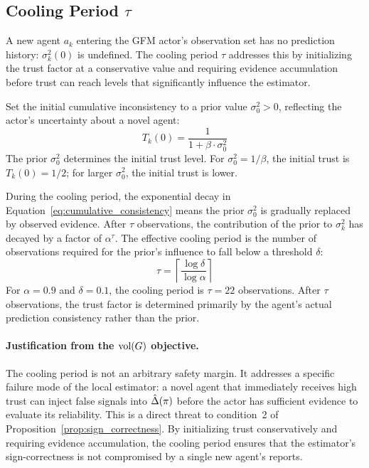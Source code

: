 
\subsection{Cooling Period \texorpdfstring{$\tau$}{tau}}
\label{app:cooling_period}

A new agent $a_k$ entering the GFM actor's observation set has no prediction history: $\sigma_k^2(0)$ is undefined. The cooling period $\tau$ addresses this by initializing the trust factor at a conservative value and requiring evidence accumulation before trust can reach levels that significantly influence the estimator.

Set the initial cumulative inconsistency to a prior value $\sigma_0^2 > 0$, reflecting the actor's uncertainty about a novel agent:
\begin{equation}
\label{eq:initial_trust}
T_k(0) = \frac{1}{1 + \beta \cdot \sigma_0^2}
\end{equation}
The prior $\sigma_0^2$ determines the initial trust level. For $\sigma_0^2 = 1/\beta$, the initial trust is $T_k(0) = 1/2$; for larger $\sigma_0^2$, the initial trust is lower.

During the cooling period, the exponential decay in Equation~\eqref{eq:cumulative_consistency} means the prior $\sigma_0^2$ is gradually replaced by observed evidence. After $\tau$ observations, the contribution of the prior to $\sigma_k^2$ has decayed by a factor of $\alpha^\tau$. The effective cooling period is the number of observations required for the prior's influence to fall below a threshold $\delta$:
\begin{equation}
\label{eq:cooling_period}
\tau = \left\lceil \frac{\log \delta}{\log \alpha} \right\rceil
\end{equation}
For $\alpha = 0.9$ and $\delta = 0.1$, the cooling period is $\tau = 22$ observations. After $\tau$ observations, the trust factor is determined primarily by the agent's actual prediction consistency rather than the prior.

\paragraph{Justification from the $\operatorname{vol}(G)$ objective.} The cooling period is not an arbitrary safety margin. It addresses a specific failure mode of the local estimator: a novel agent that immediately receives high trust can inject false signals into $\hat{\Delta}(\pi)$ before the actor has sufficient evidence to evaluate its reliability. This is a direct threat to condition~2 of Proposition~\ref{prop:sign_correctness}. By initializing trust conservatively and requiring evidence accumulation, the cooling period ensures that the estimator's sign-correctness is not compromised by a single new agent's reports.

